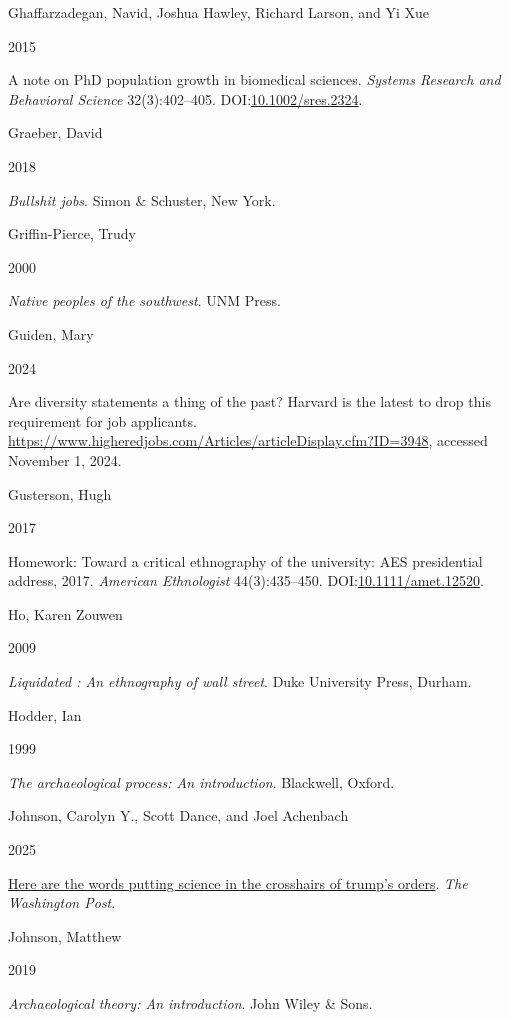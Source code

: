 \documentclass[
  12pt,
]{article}
\newlength{\cslhangindent}
\newlength{\csllabelwidth}
\newenvironment{CSLReferences}[2] %
 {\begin{list}{}{%
  \setlength{\itemindent}{0pt}
  \setlength{\leftmargin}{0pt}
  \setlength{\parsep}{0pt}
  \ifodd #1
   \setlength{\leftmargin}{\cslhangindent}
   \setlength{\itemindent}{-1\cslhangindent}
  \fi
  \setlength{\itemsep}{#2\baselineskip}}}
 {\end{list}}
\newcommand{\CSLBlock}[1]{\hfill\break\parbox[t]{\linewidth}{\strut\ignorespaces#1\strut}}
\newcommand{\CSLLeftMargin}[1]{\parbox[t]{\csllabelwidth}{\strut#1\strut}}
\newcommand{\CSLRightInline}[1]{\parbox[t]{\linewidth - \csllabelwidth}{\strut#1\strut}}
\begin{document}
\begin{CSLReferences}{0}{1}
\CSLBlock{Ghaffarzadegan, Navid, Joshua Hawley, Richard Larson, and Yi
Xue}
\CSLLeftMargin{ 2015}%
\CSLRightInline{A note on PhD population growth in biomedical sciences.
\emph{Systems Research and Behavioral Science} 32(3):402--405.
DOI:\href{https://doi.org/10.1002/sres.2324}{10.1002/sres.2324}.}

\CSLBlock{Graeber, David}
\CSLLeftMargin{ 2018}%
\CSLRightInline{\emph{Bullshit jobs}. Simon \& Schuster, New York.}

\CSLBlock{Griffin-Pierce, Trudy}
\CSLLeftMargin{ 2000}%
\CSLRightInline{\emph{Native peoples of the southwest}. UNM Press.}

\CSLBlock{Guiden, Mary}
\CSLLeftMargin{ 2024}%
\CSLRightInline{Are diversity statements a thing of the past? Harvard is
the latest to drop this requirement for job applicants.
\url{https://www.higheredjobs.com/Articles/articleDisplay.cfm?ID=3948},
accessed November 1, 2024.}

\CSLBlock{Gusterson, Hugh}
\CSLLeftMargin{ 2017}%
\CSLRightInline{Homework: Toward a critical ethnography of the
university: AES presidential address, 2017. \emph{American Ethnologist}
44(3):435--450.
DOI:\href{https://doi.org/10.1111/amet.12520}{10.1111/amet.12520}.}

\CSLBlock{Ho, Karen Zouwen}
\CSLLeftMargin{ 2009}%
\CSLRightInline{\emph{Liquidated : An ethnography of wall street}. Duke
University Press, Durham.}

\CSLBlock{Hodder, Ian}
\CSLLeftMargin{ 1999}%
\CSLRightInline{\emph{The archaeological process: An introduction}.
Blackwell, Oxford.}

\CSLBlock{Johnson, Carolyn Y., Scott Dance, and Joel Achenbach}
\CSLLeftMargin{ 2025}%
\CSLRightInline{\href{https://www.washingtonpost.com/science/2025/02/04/national-science-foundation-trump-executive-orders-words/}{Here
are the words putting science in the crosshairs of trump{'}s orders}.
\emph{The Washington Post}.}

\CSLBlock{Johnson, Matthew}
\CSLLeftMargin{ 2019}%
\CSLRightInline{\emph{Archaeological theory: An introduction}. John
Wiley \& Sons.}


\end{CSLReferences}
\end{document}
